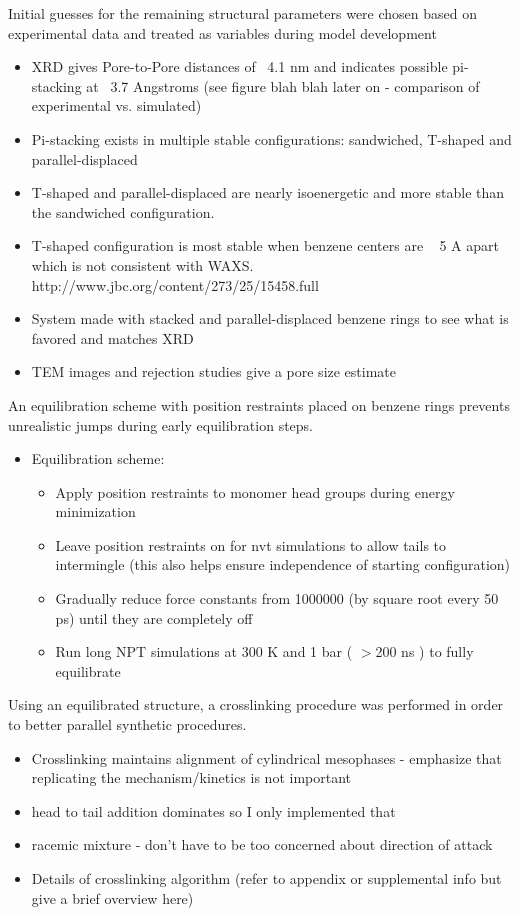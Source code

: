 \documentclass{article}
\begin{document}
	\noindent Initial guesses for the remaining structural parameters were chosen based on experimental data and treated as variables during model development 
	\begin{itemize}
		\item XRD gives Pore-to-Pore distances of ~4.1 nm and indicates possible pi-stacking at ~3.7 Angstroms (see figure blah blah later on - comparison of experimental vs. simulated)
		\item Pi-stacking exists in multiple stable configurations: sandwiched, T-shaped and parallel-displaced
		\item T-shaped and parallel-displaced are nearly isoenergetic and more stable than the sandwiched configuration.
		\item T-shaped configuration is most stable when benzene centers are ~ 5 A apart which is not consistent with WAXS. http://www.jbc.org/content/273/25/15458.full 
		\item System made with stacked and parallel-displaced benzene rings to see what is favored and matches XRD
		\item TEM images and rejection studies give a pore size estimate
	\end{itemize}

	An equilibration scheme with position restraints placed on benzene rings prevents unrealistic jumps during early equilibration steps.
	\begin{itemize}
		\item Equilibration scheme:
		\begin{itemize}
			\item Apply position restraints to monomer head groups during energy minimization 
			\item Leave position restraints on for nvt simulations to allow tails to intermingle (this also helps ensure independence of starting configuration)
			\item Gradually reduce force constants from 1000000 (by square root every 50 ps) until they are completely off
			\item Run long NPT simulations at 300 K and 1 bar ( $>$200 ns ) to fully equilibrate 
		\end{itemize}
	\end{itemize}
	
	Using an equilibrated structure, a crosslinking procedure was performed in order to better parallel synthetic procedures. 
	\begin{itemize}
		\item Crosslinking maintains alignment of cylindrical mesophases - emphasize that replicating the mechanism/kinetics is not important 
		\item head to tail addition dominates so I only implemented that
		\item racemic mixture - don't have to be too concerned about direction of attack 
		\item Details of crosslinking algorithm (refer to appendix or supplemental info but give a brief overview here)
	\end{itemize}  
	
\end{document}
